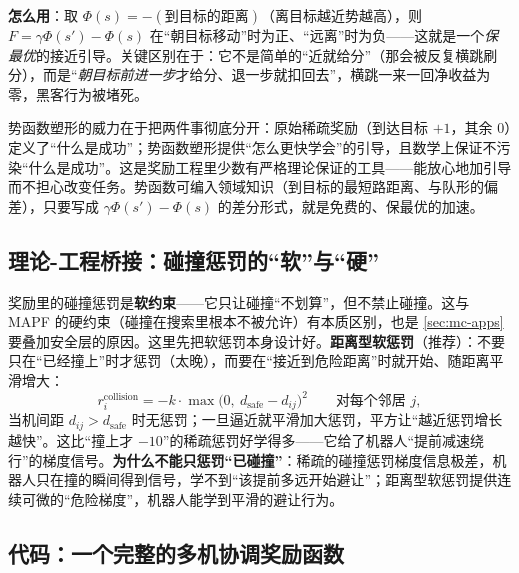 \noindent \textbf{怎么用}：取 $\Phi(s)=-(\text{到目标的距离})$（离目标越近势越高），则 $F=\gamma\Phi(s')-\Phi(s)$ 在“朝目标移动”时为正、“远离”时为负——这就是一个\emph{保最优}的接近引导。关键区别在于：它不是简单的“近就给分”（那会被反复横跳刷分），而是“\emph{朝目标前进一步}才给分、退一步就扣回去”，横跳一来一回净收益为零，黑客行为被堵死。

\begin{insight}
势函数塑形的威力在于把两件事彻底分开：原始稀疏奖励（到达目标 $+1$，其余 $0$）定义了“什么是成功”；势函数塑形提供“怎么更快学会”的引导，且数学上保证不污染“什么是成功”。这是奖励工程里少数有严格理论保证的工具——能放心地加引导而不担心改变任务。势函数可编入领域知识（到目标的最短路距离、与队形的偏差），只要写成 $\gamma\Phi(s')-\Phi(s)$ 的差分形式，就是免费的、保最优的加速。
\end{insight}

\subsection{理论-工程桥接：碰撞惩罚的“软”与“硬”}
\label{sec:mc-soft-collision}

奖励里的碰撞惩罚是\textbf{软约束}——它只让碰撞“不划算”，但不禁止碰撞。这与 MAPF 的硬约束（碰撞在搜索里根本不被允许）有本质区别，也是 \cref{sec:mc-apps} 要叠加安全层的原因。这里先把软惩罚本身设计好。\textbf{距离型软惩罚}（推荐）：不要只在“已经撞上”时才惩罚（太晚），而要在“接近到危险距离”时就开始、随距离平滑增大：
\begin{equation}
  r_i^{\text{collision}}=-k\cdot\max\!\big(0,\ d_{\text{safe}}-d_{ij}\big)^2\qquad\text{对每个邻居 }j,
  \label{eq:mc-soft-collision}
\end{equation}
当机间距 $d_{ij}>d_{\text{safe}}$ 时无惩罚；一旦逼近就平滑加大惩罚，平方让“越近惩罚增长越快”。这比“撞上才 $-10$”的稀疏惩罚好学得多——它给了机器人“提前减速绕行”的梯度信号。\textbf{为什么不能只惩罚“已碰撞”}：稀疏的碰撞惩罚梯度信息极差，机器人只在撞的瞬间得到信号，学不到“该提前多远开始避让”；距离型软惩罚提供连续可微的“危险梯度”，机器人能学到平滑的避让行为。

\subsection{代码：一个完整的多机协调奖励函数}
\label{sec:mc-reward-code}

